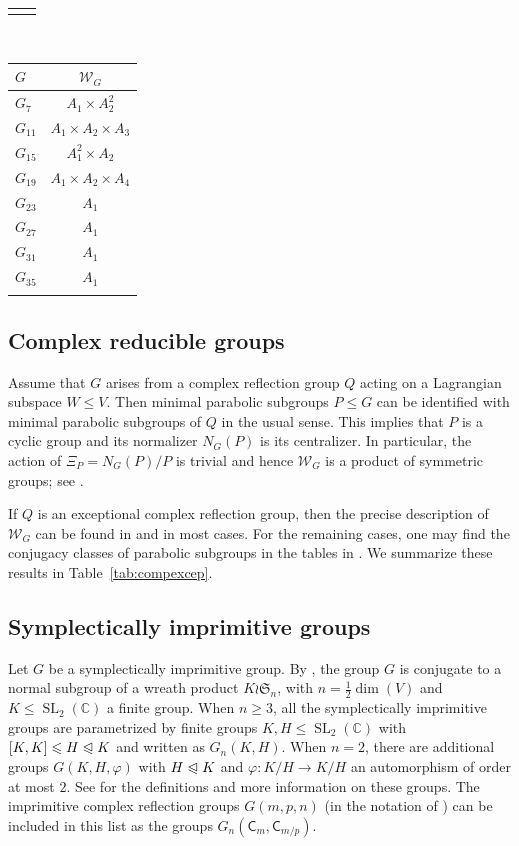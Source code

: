 \documentclass[10pt,a4paper]{amsart}
\DeclareMathOperator{\SL}{SL}
\newcommand{\CC}{\mathbb C}
\renewcommand{\phi}{\varphi}
\begin{document}
\begin{table}[h]
\begin{tabular}{|l|c|}
               &
  \end{tabular}~
  \begin{tabular}{|l|c|}
    \(G\)      & \(\mathcal W_G\) \\
    \hline
    \(G_7\)    & \(A_1\times A_2^2\) \\
    \(G_{11}\) & \(A_1\times A_2\times A_3\) \\
    \(G_{15}\) & \(A_1^2\times A_2\) \\
    \(G_{19}\) & \(A_1\times A_2\times A_4\)\\
    \(G_{23}\) & \(A_1\) \\
    \(G_{27}\) & \(A_1\) \\
    \(G_{31}\) & \(A_1\) \\
    \(G_{35}\) & \(A_1\) \\
               &
  \end{tabular}
\end{table}

\subsection{Complex reducible groups}
Assume that \(G\) arises from a complex reflection group \(Q\) acting on a Lagrangian subspace \(W\leqslant V\).
Then minimal parabolic subgroups \(P\leqslant G\) can be identified with minimal parabolic subgroups of \(Q\) in the usual sense.
This implies that \(P\) is a cyclic group and its normalizer \(N_G(P)\) is its centralizer. In particular, the action of $\Xi_P = N_G(P) / P$ is trivial and hence \(\mathcal W_G\) is a product of symmetric groups; see \cite[Lem.~4.1]{BST18}.

If \(Q\) is an exceptional complex reflection group, then the precise description of \(\mathcal W_G\) can be found in \cite[Lem.~7.3]{BST18} and \cite[Tab.~1]{BST18} in most cases. For the remaining cases, one may find the conjugacy classes of parabolic subgroups in the tables in \cite[App.~C]{OT92}. We summarize these results in Table~\ref{tab:compexcep}.

\subsection{Symplectically imprimitive groups}
Let \(G\) be a symplectically imprimitive group. By \cite{Coh80}, the group \(G\) is conjugate to a normal subgroup of a wreath product \(K\wr \mathfrak S_n\), with \(n = \frac{1}{2}\dim(V)\) and \(K\leqslant \SL_2(\CC)\) a finite group.
When $n \geqslant 3$, all the symplectically imprimitive groups are parametrized by finite groups \(K, H\leqslant\SL_2(\CC)\) with \([K, K] \leqslant H\trianglelefteqslant K\) and written as \(G_n(K, H)\).
When \(n = 2\), there are additional groups \(G(K, H, \phi)\) with \(H\trianglelefteqslant K\) and \(\phi:K/H\to K/H\) an automorphism of order at most $2$.
See \cite{Coh80, Tay25, Wal25} for the definitions and more information on these groups.
The imprimitive complex reflection groups \(G(m, p, n)\) (in the notation of \cite{ST54}) can be included in this list as the groups \(G_n(\mathsf C_m, \mathsf C_{m/p})\).
\end{document}
